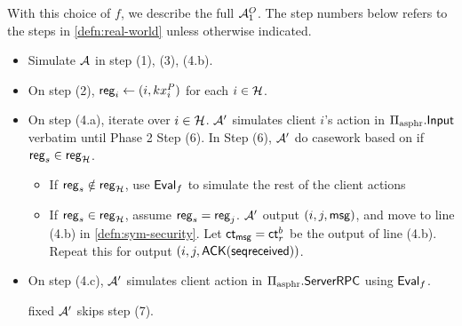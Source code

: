 With this choice of $f$, we describe the full $\mathcal{A}_1^O$. The step numbers below refers to the steps in \cref{defn:real-world} unless otherwise indicated.
\begin{itemize}
    \item Simulate $\mathcal{A}$ in step (1), (3), (4.b).
    \item On step (2), $\mathsf{reg}_i \leftarrow (i, kx_i^{P})$ for each $i \in \mathcal{H}$. 
    \item On step (4.a), iterate over $i \in \mathcal{H}$. $\mathcal{A}'$ simulates client $i$'s action in $\Pi_{\text{asphr}}.\mathsf{Input}$ verbatim until Phase 2 Step (6). In Step (6), $\mathcal{A}'$ do casework based on if $\mathsf{reg}_s \in \mathsf{reg}_{\mathcal{H}}$. 
    \begin{itemize}
        \item  If $\mathsf{reg}_s \notin \mathsf{reg}_{\mathcal{H}}$, use $\mathsf{Eval}_f$ to simulate the rest of the client actions
        \item  If $\mathsf{reg}_s \in \mathsf{reg}_{\mathcal{H}}$, assume $\mathsf{reg}_s = \mathsf{reg}_j$. $\mathcal{A}'$ output $(i, j, \mathsf{msg})$, and move to line (4.b) in \cref{defn:sym-security}. Let $\mathsf{ct}_{\mathsf{msg}} = \mathsf{ct}^b_r$ be the output of line (4.b). Repeat this for output $(i,j, \mathsf{ACK}(\mathsf{seqreceived}))$.
    \end{itemize}
   
    \item On step (4.c), $\mathcal{A}'$ simulates client action in $\Pi_{\text{asphr}}.\mathsf{ServerRPC}$ using $\mathsf{Eval}_f$.
    
    fixed $\mathcal{A}'$ skips step (7). 
\end{itemize}


